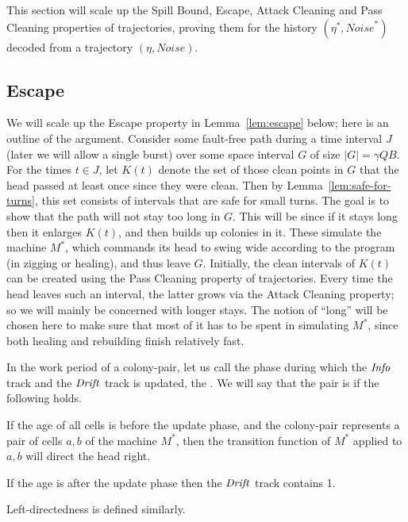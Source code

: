 \documentclass[11pt]{memoir}
\theoremstyle{definition} %
\newcommand{\fld}[1]{\ensuremath{\textit{#1\/}}}
\def\B{B}
\newcommand{\Noise}{\mathit{Noise}}
\newcommand{\Q}{Q} %
\newcommand{\Drift}{\fld{Drift}}
\newcommand{\Info}{\fld{Info}}
\begin{document}
This section will scale up the Spill Bound, Escape, Attack Cleaning
and Pass Cleaning properties of trajectories, proving them for the history \( (\eta^{*},\Noise^{*}) \)
decoded from a trajectory \( (\eta,\Noise) \).

\subsection{Escape}\label{sec:escape}

We will scale up the Escape property in Lemma~\ref{lem:escape} below;
here is an outline of the argument.
Consider some fault-free path during a time interval \( J \) (later we will allow a single
burst) over some space interval \( G \) of size \( |G|=\gamma\Q\B \).
For the times \( t\in J \), let \( K(t) \) denote the set of those clean points in \( G \) that
the head passed at least once since they were clean.
Then by Lemma~\ref{lem:safe-for-turns},
this set consists of intervals that are safe for small turns.
The goal is to show that the path will not stay too long in \( G \).
This will be since if it stays long then it enlarges \( K(t) \), and then builds up colonies in it.
These simulate the machine \( M^{*} \), which commands its head to swing wide according
to the program (in zigging or healing), and thus leave \( G \).
Initially, the clean intervals of \( K(t) \) can be created using the 
Pass Cleaning property of trajectories.
Every time the head leaves such an interval, the latter grows via the Attack Cleaning property;
so we will mainly be concerned with longer stays.
The notion of ``long'' will be chosen here to make sure that most of it has to be spent in
simulating \( M^{*} \), since both healing and rebuilding finish relatively fast.

\begin{definition}\label{def:directed-colony-pair}
  In the work period of a colony-pair, let us call the phase during which
  the \( \Info \) track and the \( \Drift \) track is updated, the .
  We will say that the pair is  if the following holds.

  If the age of all cells is before the update phase, and 
  the colony-pair represents a pair of cells \( a,b \) of the machine \( M^{*} \), then the
  transition function of \( M^{*} \) applied to \( a,b \) will direct the head right.

  If the age is after the update phase then the \( \Drift \) track contains 1.

  Left-directedness is defined similarly.
\end{definition}
\end{document}

